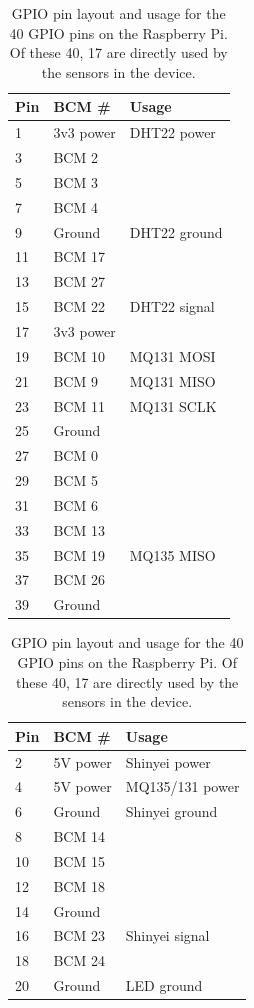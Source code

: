 \documentclass[11pt,twosided,a4paper]{report}
\begin{document}
\begin{table}[!tb]
  \centering
  \small
  \caption{GPIO pin layout and usage for the 40 GPIO pins on the Raspberry Pi. Of these 40, 17 are directly used by the sensors in the device.}
  \label{gpio}
  \begin{tabular}{ l l l }
  \toprule
  Pin & BCM \# & Usage \\ \midrule
  1 & 3v3 power & DHT22 power  \\
  3 & BCM 2 &  \\
  5 & BCM 3 &  \\
  7 & BCM 4 &  \\
  9 & Ground & DHT22 ground  \\
  11 & BCM 17 &  \\
  13 & BCM 27 &  \\
  15 & BCM 22 & DHT22 signal  \\
  17 & 3v3 power &  \\
  19 & BCM 10 & MQ131 MOSI \\
  21 & BCM 9 & MQ131 MISO \\
  23 & BCM 11 & MQ131 SCLK \\
  25 & Ground &  \\
  27 & BCM 0 &  \\
  29 & BCM 5 &  \\
  31 & BCM 6 &  \\
  33 & BCM 13 &  \\
  35 & BCM 19 & MQ135 MISO \\
  37 & BCM 26 &  \\
  39 & Ground &  \\ \bottomrule
  \end{tabular}
  \hspace{0.5em}
  \begin{tabular}{ l l l }
  \toprule
  Pin & BCM \# & Usage \\ \midrule
  2 & 5V power & Shinyei power \\
  4 & 5V power & MQ135/131 power \\
  6 & Ground & Shinyei ground  \\
  8 & BCM 14 &  \\
  10 & BCM 15 &  \\
  12 & BCM 18 &  \\
  14 & Ground &  \\
  16 & BCM 23 & Shinyei signal \\
  18 & BCM 24 & \\
  20 & Ground & LED ground \\

\end{tabular}
\end{table}
\end{document}
